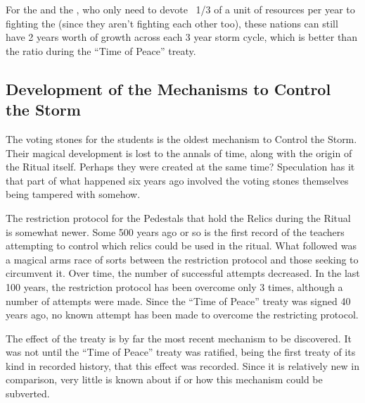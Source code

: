 \documentclass[blue]{GL2020}
\begin{document}
For the \pFarm{} and the \pTech{}, who only need to devote ~1/3 of a unit of resources per year to fighting the \pShip{} (since they aren't fighting each other too), these nations can still have 2 years worth of growth across each 3 year storm cycle, which is better than the ratio during the ``Time of Peace'' treaty.

\subsection*{Development of the Mechanisms to Control the Storm}
The voting stones for the students is the oldest mechanism to Control the Storm. Their magical development is lost to the annals of time, along with the origin of the Ritual itself. Perhaps they were created at the same time? Speculation has it that part of what happened six years ago involved the voting stones themselves being tampered with somehow.

The restriction protocol for the Pedestals that hold the Relics during the Ritual is somewhat newer. Some 500 years ago or so is the first record of the teachers attempting to control which relics could be used in the ritual. What followed was a magical arms race of sorts between the restriction protocol and those seeking to circumvent it. Over time, the number of successful attempts decreased. In the last 100 years, the restriction protocol has been overcome only 3 times, although a number of attempts were made. Since the ``Time of Peace'' treaty was signed 40 years ago, no known attempt has been made to overcome the restricting protocol.

The effect of the treaty is by far the most recent mechanism to be discovered. It was not until the ``Time of Peace'' treaty was ratified, being the first treaty of its kind in recorded history, that this effect was recorded. Since it is relatively new in comparison, very little is known about if or how this mechanism could be subverted.
\end{document}
